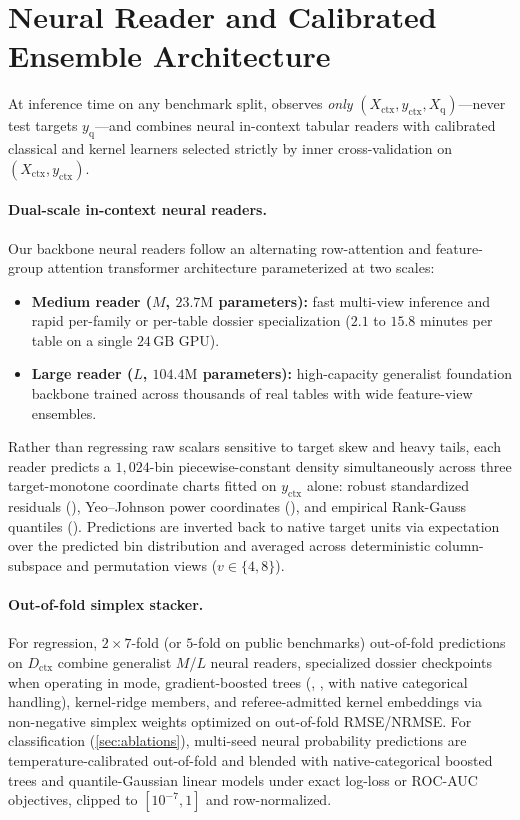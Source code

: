 \section{Neural Reader and Calibrated Ensemble Architecture}
\label{sec:architecture}

At inference time on any benchmark split, \EZ{} observes \emph{only} $(X_{\mathrm{ctx}}, y_{\mathrm{ctx}}, X_{\mathrm{q}})$---never test targets $y_{\mathrm{q}}$---and combines neural in-context tabular readers with calibrated classical and kernel learners selected strictly by inner cross-validation on $(X_{\mathrm{ctx}}, y_{\mathrm{ctx}})$.

\paragraph{Dual-scale in-context neural readers.}
Our backbone neural readers follow an alternating row-attention and feature-group attention transformer architecture parameterized at two scales:
\begin{itemize}
  \item \textbf{Medium reader ($M$, $23.7\mathrm{M}$ parameters):} fast multi-view inference and rapid per-family or per-table dossier specialization ($2.1$ to $15.8$ minutes per table on a single $24\,\mathrm{GB}$ GPU).
  \item \textbf{Large reader ($L$, $104.4\mathrm{M}$ parameters):} high-capacity generalist foundation backbone trained across thousands of real tables with wide feature-view ensembles.
\end{itemize}
Rather than regressing raw scalars sensitive to target skew and heavy tails, each reader predicts a $1{,}024$-bin piecewise-constant density simultaneously across three target-monotone coordinate charts fitted on $y_{\mathrm{ctx}}$ alone: robust standardized residuals (), Yeo--Johnson power coordinates (), and empirical Rank-Gauss quantiles (). Predictions are inverted back to native target units via expectation over the predicted bin distribution and averaged across deterministic column-subspace and permutation views ($v \in \{4, 8\}$).

\paragraph{Out-of-fold simplex stacker.}
For regression, $2 \times 7$-fold (or $5$-fold on public benchmarks) out-of-fold predictions on $D_{\mathrm{ctx}}$ combine generalist $M$/$L$ neural readers, specialized dossier checkpoints when operating in \regrecall{} mode, gradient-boosted trees (, ,  with native categorical handling), kernel-ridge members, and referee-admitted kernel embeddings via non-negative simplex weights optimized on out-of-fold RMSE/NRMSE. For classification (\cref{sec:ablations}), multi-seed neural probability predictions are temperature-calibrated out-of-fold and blended with native-categorical boosted trees and quantile-Gaussian linear models under exact log-loss or ROC-AUC objectives, clipped to $[10^{-7}, 1]$ and row-normalized.
